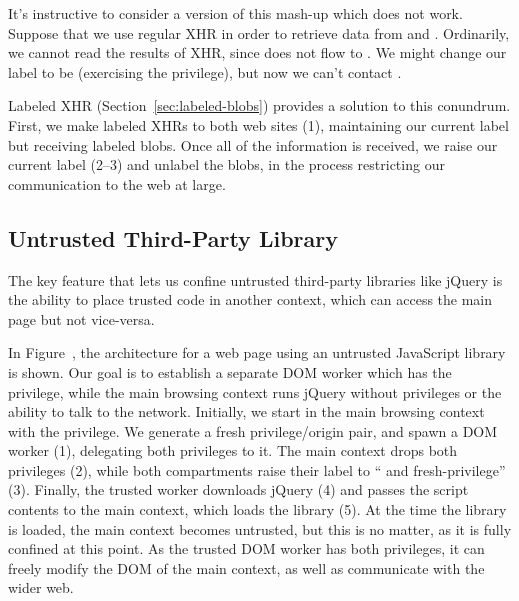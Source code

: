 It's instructive to consider a version of this mash-up which does not
work.  Suppose that we use regular XHR in order to retrieve data from
 and .  Ordinarily, we cannot read
the results of XHR, since  does not flow to .
We might change our label to be  (exercising the 
privilege), but now we can't contact .

Labeled XHR (Section~\ref{sec:labeled-blobs}) provides a solution to
this conundrum.  First, we make labeled XHRs to both web sites (1),
maintaining our current label but receiving labeled blobs.  Once all of
the information is received, we raise our current label (2--3) and
unlabel the blobs, in the process restricting our communication to the
web at large.

\subsection{Untrusted Third-Party Library}
\label{sec:apps-third-party}

The key feature that lets us confine untrusted third-party libraries
like jQuery is the ability to place trusted code in another context,
which can access the main page but not vice-versa.

In Figure~, the architecture for a web page using an
untrusted JavaScript library is shown.  Our goal is to establish a
separate DOM worker which has the  privilege, while the
main browsing context runs jQuery without privileges or the ability to
talk to the network.  Initially, we start in the main browsing context
with the  privilege.  We generate a fresh privilege/origin
pair, and spawn a DOM worker (1), delegating both privileges to it.  The
main context drops both privileges (2), while both compartments raise
their label to `` and fresh-privilege'' (3).  Finally, the
trusted worker downloads jQuery (4) and passes the script contents to
the main context, which loads the library (5).  At the time the library
is loaded, the main context becomes untrusted, but this is no matter, as
it is fully confined at this point.  As the trusted DOM worker has both
privileges, it can freely modify the DOM of the main context, as well as
communicate with the wider web.
